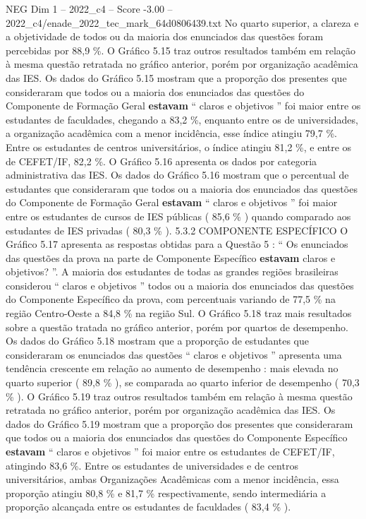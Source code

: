 \begin{textsample}{NEG Dim 1 – 2022\_c4 – Score -3.00 – 2022\_c4/enade\_2022\_tec\_mark\_64d0806439.txt}
No quarto superior, a clareza e a objetividade de todos ou da maioria dos enunciados das questões foram percebidas por 88,9 \%.
O Gráfico 5.15 traz outros resultados também em relação à mesma questão retratada no gráfico anterior, porém por organização acadêmica das IES.
Os dados do Gráfico 5.15 mostram que a proporção dos presentes que consideraram que todos ou a maioria dos enunciados das questões do Componente de Formação Geral \textbf{estavam} “ claros e objetivos ” foi maior entre os estudantes de faculdades, chegando a 83,2 \%, enquanto entre os de universidades, a organização acadêmica com a menor incidência, esse índice atingiu 79,7 \%.
Entre os estudantes de centros universitários, o índice atingiu 81,2 \%, e entre os de CEFET/IF, 82,2 \%.
O Gráfico 5.16 apresenta os dados por categoria administrativa das IES.
Os dados do Gráfico 5.16 mostram que o percentual de estudantes que consideraram que todos ou a maioria dos enunciados das questões do Componente de Formação Geral \textbf{estavam} “ claros e objetivos ” foi maior entre os estudantes de cursos de IES públicas ( 85,6 \% ) quando comparado aos estudantes de IES privadas ( 80,3 \% ). 5.3.2 COMPONENTE ESPECÍFICO O Gráfico 5.17 apresenta as respostas obtidas para a Questão 5 : “ Os enunciados das questões da prova na parte de Componente Específico \textbf{estavam} claros e objetivos? ”.
A maioria dos estudantes de todas as grandes regiões brasileiras considerou “ claros e objetivos ” todos ou a maioria dos enunciados das questões do Componente Específico da prova, com percentuais variando de 77,5 \% na região Centro-Oeste a 84,8 \% na região Sul.
O Gráfico 5.18 traz mais resultados sobre a questão tratada no gráfico anterior, porém por quartos de desempenho.
Os dados do Gráfico 5.18 mostram que a proporção de estudantes que consideraram os enunciados das questões “ claros e objetivos ” apresenta uma tendência crescente em relação ao aumento de desempenho : mais elevada no quarto superior ( 89,8 \% ), se comparada ao quarto inferior de desempenho ( 70,3 \% ).
O Gráfico 5.19 traz outros resultados também em relação à mesma questão retratada no gráfico anterior, porém por organização acadêmica das IES.
Os dados do Gráfico 5.19 mostram que a proporção dos presentes que consideraram que todos ou a maioria dos enunciados das questões do Componente Específico \textbf{estavam} “ claros e objetivos ” foi maior entre os estudantes de CEFET/IF, atingindo 83,6 \%.
Entre os estudantes de universidades e de centros universitários, ambas Organizações Acadêmicas com a menor incidência, essa proporção atingiu 80,8 \% e 81,7 \% respectivamente, sendo intermediária a proporção alcançada entre os estudantes de faculdades ( 83,4 \% ).

\end{textsample}
